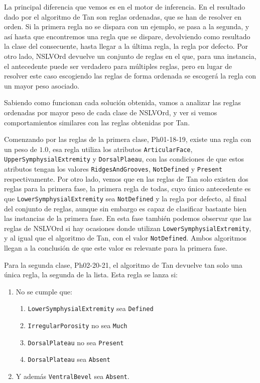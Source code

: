 La principal diferencia que vemos es en el motor de inferencia. En el resultado dado por el algoritmo de Tan son reglas ordenadas, que se han de resolver en orden. Si la primera regla no se dispara con un ejemplo, se pasa a la segunda, y así hasta que encontremos una regla que se dispare, devolviendo como resultado la clase del consecuente, hasta llegar a la última regla, la regla por defecto. Por otro lado, NSLVOrd devuelve un conjunto de reglas en el que, para una instancia, el antecedente puede ser verdadero para múltiples reglas, pero en lugar de resolver este caso escogiendo las reglas de forma ordenada se escogerá la regla con un mayor peso asociado.

Sabiendo como funcionan cada solución obtenida, vamos a analizar las reglas ordenadas por mayor peso de cada clase de NSLVOrd, y ver si vemos comportamientos similares con las reglas obtenidas por Tan.

Comenzando por las reglas de la primera clase, Ph01-18-19, existe una regla con un peso de $1.0$, esa regla utiliza los atributos \texttt{ArticularFace}, \texttt{UpperSymphysialExtremity} y \texttt{DorsalPlaeau}, con las condiciones de que estos atributos tengan los valores \texttt{RidgesAndGrooves}, \texttt{NotDefined} y \texttt{Present} respectivamente. Por otro lado, vemos que en las reglas de Tan solo existen dos reglas para la primera fase, la primera regla de todas, cuyo único antecedente es que \texttt{LowerSymphysialExtremity} sea \texttt{NotDefined} y la regla por defecto, al final del conjunto de reglas, aunque sin embargo es capaz de clasificar bastante bien las instancias de la primera fase. En esta fase también podemos observar que las reglas de NSLVOrd si hay ocasiones donde utilizan \texttt{LowerSymphysialExtremity}, y al igual que el algoritmo de Tan, con el valor \texttt{NotDefined}. Ambos algoritmos llegan a la conclusión de que este valor es relevante para la primera fase.

Para la segunda clase, Ph02-20-21, el algoritmo de Tan devuelve tan solo una única regla, la segunda de la lista. Esta regla se lanza si:

\begin{enumerate}
	\item No se cumple que:
		\begin{enumerate}
			\item \texttt{LowerSymphysialExtremity} sea \texttt{Defined}
			\item \texttt{IrregularPorosity} no sea \texttt{Much}
			\item \texttt{DorsalPlateau} no sea \texttt{Present}
			\item \texttt{DorsalPlateau} sea \texttt{Absent}
		\end{enumerate}
	\item Y además \texttt{VentralBevel} sea \texttt{Absent}.
\end{enumerate}


